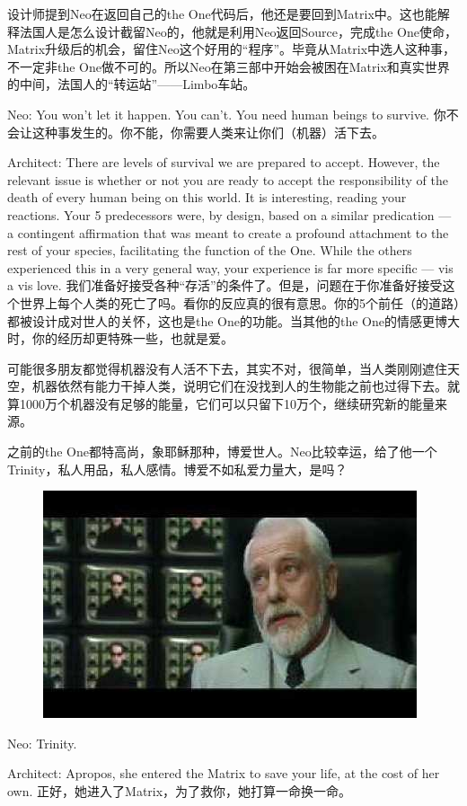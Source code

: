 \documentclass[UTF8]{ctexart}
\begin{document}
设计师提到Neo在返回自己的the One代码后，他还是要回到Matrix中。这也能解释法国人是怎么设计截留Neo的，他就是利用Neo返回Source，完成the One使命，Matrix升级后的机会，留住Neo这个好用的“程序”。毕竟从Matrix中选人这种事，不一定非the One做不可的。所以Neo在第三部中开始会被困在Matrix和真实世界的中间，法国人的“转运站”——Limbo车站。

Neo: You won't let it happen. You can't. You need human beings to survive. 你不会让这种事发生的。你不能，你需要人类来让你们（机器）活下去。

Architect: There are levels of survival we are prepared to accept. However, the relevant issue is whether or not you are ready to accept the responsibility of the death of every human being on this world. It is interesting, reading your reactions. Your 5 predecessors were, by design, based on a similar predication --- a contingent affirmation that was meant to create a profound attachment to the rest of your species, facilitating the function of the One. While the others experienced this in a very general way, your experience is far more specific --- vis a vis love. 我们准备好接受各种“存活”的条件了。但是，问题在于你准备好接受这个世界上每个人类的死亡了吗。看你的反应真的很有意思。你的5个前任（的道路）都被设计成对世人的关怀，这也是the One的功能。当其他的the One的情感更博大时，你的经历却更特殊一些，也就是爱。

可能很多朋友都觉得机器没有人活不下去，其实不对，很简单，当人类刚刚遮住天空，机器依然有能力干掉人类，说明它们在没找到人的生物能之前也过得下去。就算1000万个机器没有足够的能量，它们可以只留下10万个，继续研究新的能量来源。

之前的the One都特高尚，象耶稣那种，博爱世人。Neo比较幸运，给了他一个Trinity，私人用品，私人感情。博爱不如私爱力量大，是吗？

\begin{figure}[htb]
\centering
\includegraphics[width=0.5\linewidth]{fig/read_reloaded-165}
\end{figure}

Neo: Trinity.

Architect: Apropos, she entered the Matrix to save your life, at the cost of her own. 正好，她进入了Matrix，为了救你，她打算一命换一命。
\end{document}
